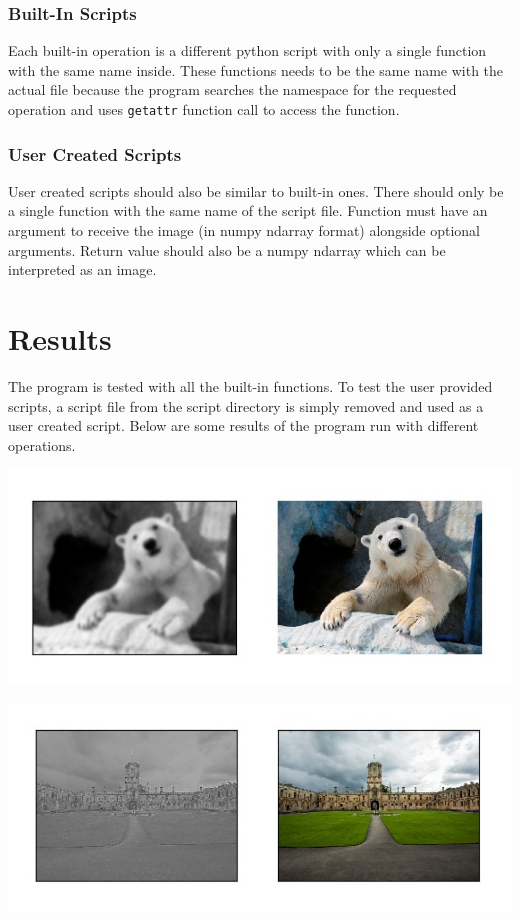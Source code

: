 \documentclass[conference,compsoc]{IEEEtran}
\begin{document}
\subsubsection{Built-In Scripts}
Each built-in operation is a different python script with only a single function with the same name inside. These functions needs to be the same name with the actual file because the program searches the namespace for the requested operation and uses \texttt{getattr} function call to access the function.

\subsubsection{User Created Scripts}
User created scripts should also be similar to built-in ones. There should only be a single function with the same name of the script file. Function must have an argument to receive the image (in numpy ndarray format) alongside optional arguments. Return value should also be a numpy ndarray which can be interpreted as an image.
\section{Results}
The program is tested with all the built-in functions. To test the user provided scripts, a script file from the script directory is simply removed and used as a user created script. Below are some results of the program run with different operations.

\begin{minipage}{0.48\linewidth}
\includegraphics[scale=.5]{Untitled.png}
\end{minipage}


\begin{minipage}{0.48\linewidth}
\includegraphics[scale=.5]{Untitled2.png}
\end{minipage}
\end{document}

